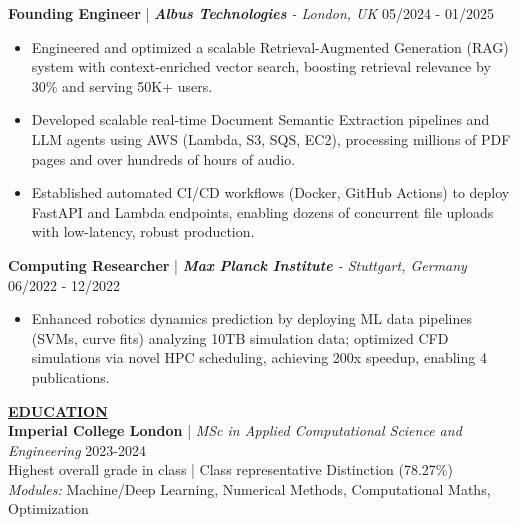 \documentclass{article}
\newlength{\remaining}
\renewcommand{\section}[1]{
  \vspace{1.0em}\setlength{\remaining}{\textwidth-\widthof{\uppercase{#1}}}
    \noindent\underline{\fontsize{10}{15}\bfseries\uppercase{#1}\hspace*{\remaining}} \\
}
\renewcommand{\subsection}[3]{
    \noindent\textbf{#1} | \emph{#2} \hfill #3  
}
\begin{document}
    \subsection{Founding Engineer}{\textbf{Albus Technologies} - London, UK}{05/2024 - 01/2025}
    \begin{itemize}
        \item Engineered and optimized a scalable Retrieval-Augmented Generation (RAG) system with context-enriched vector search, boosting retrieval relevance by 30\% and serving 50K+ users.
        \item Developed scalable real-time Document Semantic Extraction pipelines and LLM agents using AWS (Lambda, S3, SQS, EC2), processing millions of PDF pages and over hundreds of hours of audio.
        \item Established automated CI/CD workflows (Docker, GitHub Actions) to deploy FastAPI and Lambda endpoints, enabling dozens of concurrent file uploads with low-latency, robust production.
    \end{itemize}
    

    \subsection{Computing Researcher}{\textbf{Max Planck Institute} - Stuttgart, Germany}{06/2022 - 12/2022}
    \begin{itemize}
        \item Enhanced robotics dynamics prediction by deploying ML data pipelines (SVMs, curve fits) analyzing 10TB simulation data; optimized CFD simulations via novel HPC scheduling, achieving 200x speedup, enabling 4 publications.
    \end{itemize}

    
    \section{Education}
    \subsection{Imperial College London}{MSc in Applied Computational Science and Engineering}{2023-2024} \\
    Highest overall grade in class | Class representative  \hfill Distinction (78.27\%) \\
    \textit{Modules:} Machine/Deep Learning, Numerical Methods, Computational Maths, Optimization
    
\end{document}
